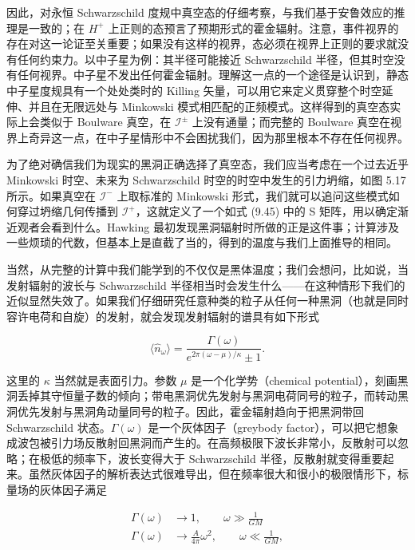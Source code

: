 因此，对永恒 Schwarzschild 度规中真空态的仔细考察，与我们基于安鲁效应的推理是一致的；在 $H^{+}$ 上正则的态预言了预期形式的霍金辐射。注意，事件视界的存在对这一论证至关重要；如果没有这样的视界，态必须在视界上正则的要求就没有任何约束力。以中子星为例：其半径可能接近 Schwarzschild 半径，但其时空没有任何视界。中子星不发出任何霍金辐射。理解这一点的一个途径是认识到，静态中子星度规具有一个处处类时的 Killing 矢量，可以用它来定义贯穿整个时空延伸、并且在无限远处与 Minkowski 模式相匹配的正频模式。这样得到的真空态实际上会类似于 Boulware 真空，在 $\mathscr{I}^{\pm}$ 上没有通量；而完整的 Boulware 真空在视界上奇异这一点，在中子星情形中不会困扰我们，因为那里根本不存在任何视界。

为了绝对确信我们为现实的黑洞正确选择了真空态，我们应当考虑在一个过去近乎 Minkowski 时空、未来为 Schwarzschild 时空的时空中发生的引力坍缩，如图 5.17 所示。如果真空在 $\mathscr{I}^{-}$ 上取标准的 Minkowski 形式，我们就可以追问这些模式如何穿过坍缩几何传播到 $\mathscr{I}^{+}$，这就定义了一个如式 (9.45) 中的 S 矩阵，用以确定渐近观者会看到什么。Hawking 最初发现黑洞辐射时所做的正是这件事；计算涉及一些烦琐的代数，但基本上是直截了当的，得到的温度与我们上面推导的相同。

当然，从完整的计算中我们能学到的不仅仅是黑体温度；我们会想问，比如说，当发射辐射的波长与 Schwarzschild 半径相当时会发生什么——在这种情形下我们的近似显然失效了。如果我们仔细研究任意种类的粒子从任何一种黑洞（也就是同时容许电荷和自旋）的发射，就会发现发射辐射的谱具有如下形式

\begin{equation*}
\langle \hat{n}_{\omega} \rangle = \frac{\Gamma(\omega)}{e^{2\pi(\omega - \mu)/\kappa} \pm 1}.
\tag{9.174}
\end{equation*}

这里的 $\kappa$ 当然就是表面引力。参数 $\mu$ 是一个化学势（chemical potential），刻画黑洞丢掉其守恒量子数的倾向；带电黑洞优先发射与黑洞电荷同号的粒子，而转动黑洞优先发射与黑洞角动量同号的粒子。因此，霍金辐射趋向于把黑洞带回 Schwarzschild 状态。$\Gamma(\omega)$ 是一个灰体因子（greybody factor），可以把它想象成波包被引力场反散射回黑洞而产生的。在高频极限下波长非常小，反散射可以忽略；在极低的频率下，波长变得大于 Schwarzschild 半径，反散射就变得重要起来。虽然灰体因子的解析表达式很难导出，但在频率很大和很小的极限情形下，标量场的灰体因子满足

\begin{align*}
\Gamma(\omega) &\to 1, \qquad \omega \gg \frac{1}{GM} \\
\Gamma(\omega) &\to \frac{A}{4\pi} \omega^{2}, \qquad \omega \ll \frac{1}{GM},
\tag{9.175}
\end{align*}

